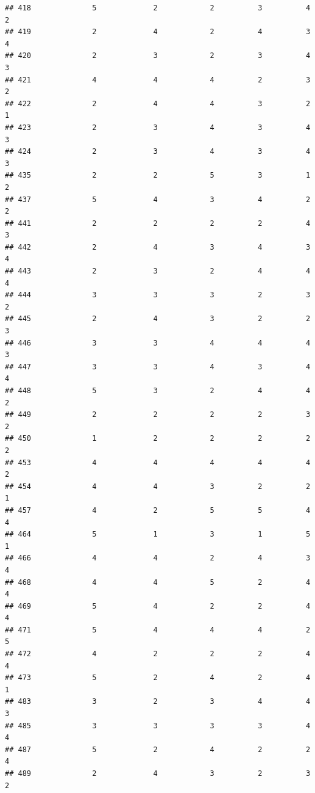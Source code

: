 \documentclass[
]{article}
\begin{document}
\begin{verbatim}
## 418              5             2            2          3          4        2
## 419              2             4            2          4          3        4
## 420              2             3            2          3          4        3
## 421              4             4            4          2          3        2
## 422              2             4            4          3          2        1
## 423              2             3            4          3          4        3
## 424              2             3            4          3          4        3
## 435              2             2            5          3          1        2
## 437              5             4            3          4          2        2
## 441              2             2            2          2          4        3
## 442              2             4            3          4          3        4
## 443              2             3            2          4          4        4
## 444              3             3            3          2          3        2
## 445              2             4            3          2          2        3
## 446              3             3            4          4          4        3
## 447              3             3            4          3          4        4
## 448              5             3            2          4          4        2
## 449              2             2            2          2          3        2
## 450              1             2            2          2          2        2
## 453              4             4            4          4          4        2
## 454              4             4            3          2          2        1
## 457              4             2            5          5          4        4
## 464              5             1            3          1          5        1
## 466              4             4            2          4          3        4
## 468              4             4            5          2          4        4
## 469              5             4            2          2          4        4
## 471              5             4            4          4          2        5
## 472              4             2            2          2          4        4
## 473              5             2            4          2          4        1
## 483              3             2            3          4          4        3
## 485              3             3            3          3          4        4
## 487              5             2            4          2          2        4
## 489              2             4            3          2          3        2

\end{verbatim}
\end{document}
